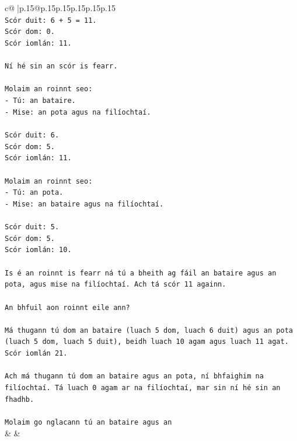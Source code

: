 \documentclass{article}
\begin{document}
{\begin{supertabular}{c@{$\;$}|p{.15\linewidth}@{}p{.15\linewidth}p{.15\linewidth}p{.15\linewidth}p{.15\linewidth}p{.15\linewidth}}
{{{\\ 
\texttt{Scór duit: 6 + 5 = 11.} \\
\texttt{Scór dom: 0.} \\
\texttt{Scór iomlán: 11.} \\
\\ 
\texttt{Ní hé sin an scór is fearr.} \\
\\ 
\texttt{Molaim an roinnt seo:} \\
\texttt{{-} Tú: an bataire.} \\
\texttt{{-} Mise: an pota agus na filíochtaí.} \\
\\ 
\texttt{Scór duit: 6.} \\
\texttt{Scór dom: 5.} \\
\texttt{Scór iomlán: 11.} \\
\\ 
\texttt{Molaim an roinnt seo:} \\
\texttt{{-} Tú: an pota.} \\
\texttt{{-} Mise: an bataire agus na filíochtaí.} \\
\\ 
\texttt{Scór duit: 5.} \\
\texttt{Scór dom: 5.} \\
\texttt{Scór iomlán: 10.} \\
\\ 
\texttt{Is é an roinnt is fearr ná tú a bheith ag fáil an bataire agus an pota, agus mise na filíochtaí. Ach tá scór 11 againn.} \\
\\ 
\texttt{An bhfuil aon roinnt eile ann?} \\
\\ 
\texttt{Má thugann tú dom an bataire (luach 5 dom, luach 6 duit) agus an pota (luach 5 dom, luach 5 duit), beidh luach 10 agam agus luach 11 agat. Scór iomlán 21.} \\
\\ 
\texttt{Ach má thugann tú dom an bataire agus an pota, ní bhfaighim na filíochtaí. Tá luach 0 agam ar na filíochtaí, mar sin ní hé sin an fhadhb.} \\
\\ 
\texttt{Molaim go nglacann tú an bataire agus an} \\
            }
        }
    }
    & & \\ \\


\end{supertabular}}
\end{document}
